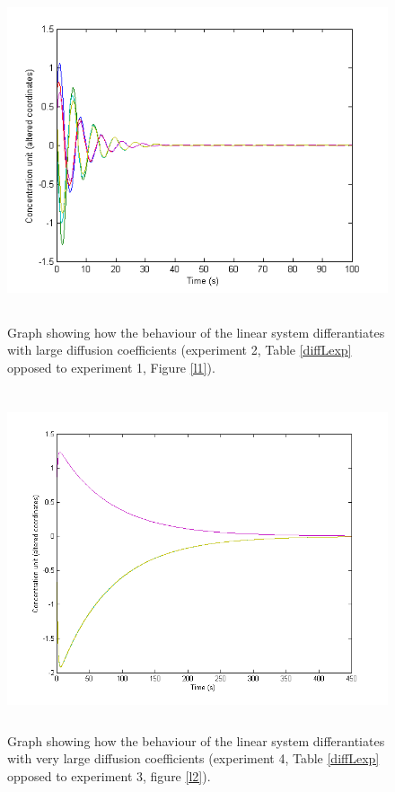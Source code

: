 \begin{figure}
\centering
\includegraphics[width=15cm, height=10cm]{ld1.png}
\caption{Graph showing how the behaviour of the linear system differantiates with large diffusion coefficients (experiment 2, Table \ref{diffLexp} opposed to experiment 1, Figure \ref{l1}).}
\label{ld1}
\end{figure}

\begin{figure}
\centering
\includegraphics[width=15cm, height=10cm]{ld2.png}
\caption{Graph showing how the behaviour of the linear system differantiates with very large diffusion coefficients (experiment 4, Table \ref{diffLexp} opposed to experiment 3, figure \ref{l2}).}
\label{ld2}
\end{figure}

